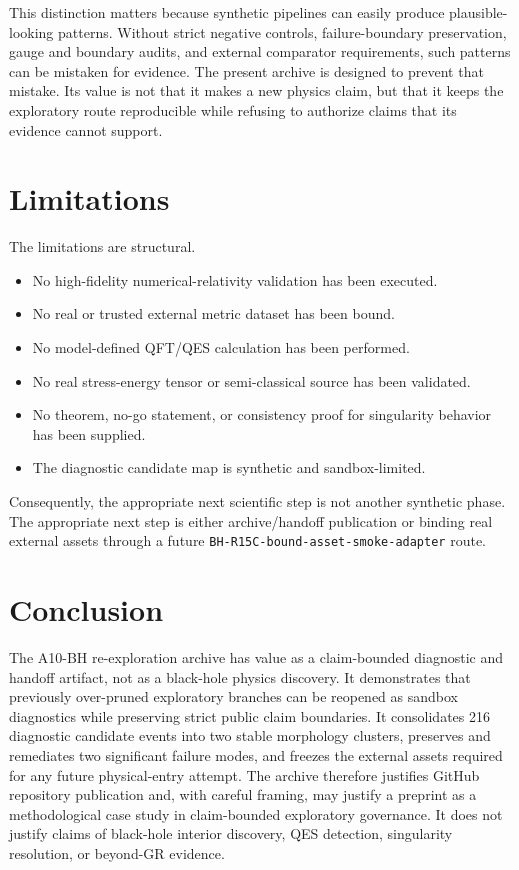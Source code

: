 \documentclass[11pt,a4paper]{article}
\begin{document}
This distinction matters because synthetic pipelines can easily produce plausible-looking patterns. Without strict negative controls, failure-boundary preservation, gauge and boundary audits, and external comparator requirements, such patterns can be mistaken for evidence. The present archive is designed to prevent that mistake. Its value is not that it makes a new physics claim, but that it keeps the exploratory route reproducible while refusing to authorize claims that its evidence cannot support.

\section{Limitations}

The limitations are structural.

\begin{itemize}
  \item No high-fidelity numerical-relativity validation has been executed.
  \item No real or trusted external metric dataset has been bound.
  \item No model-defined QFT/QES calculation has been performed.
  \item No real stress-energy tensor or semi-classical source has been validated.
  \item No theorem, no-go statement, or consistency proof for singularity behavior has been supplied.
  \item The diagnostic candidate map is synthetic and sandbox-limited.
\end{itemize}

Consequently, the appropriate next scientific step is not another synthetic phase. The appropriate next step is either archive/handoff publication or binding real external assets through a future \texttt{BH-R15C-bound-asset-smoke-adapter} route.

\section{Conclusion}

The A10-BH re-exploration archive has value as a claim-bounded diagnostic and handoff artifact, not as a black-hole physics discovery. It demonstrates that previously over-pruned exploratory branches can be reopened as sandbox diagnostics while preserving strict public claim boundaries. It consolidates 216 diagnostic candidate events into two stable morphology clusters, preserves and remediates two significant failure modes, and freezes the external assets required for any future physical-entry attempt. The archive therefore justifies GitHub repository publication and, with careful framing, may justify a preprint as a methodological case study in claim-bounded exploratory governance. It does not justify claims of black-hole interior discovery, QES detection, singularity resolution, or beyond-GR evidence.
\end{document}
